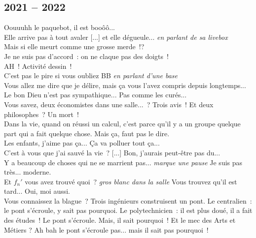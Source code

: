 \documentclass[french, a4paper, openany]{book}
\begin{document}
	\subsection*{2021 -- 2022}

	\noindent \og Oouuuhh le paquebot, il est booôô... \fg \\
	\og Elle arrive pas à tout avaler [...] et elle dégueule... \fg \emph{en parlant de sa livebox} \\
	\og Mais si elle meurt comme une grosse merde~!? \fg \\
	\og Je ne suis pas d'accord~: on ne claque pas des doigts~! \fg \\
	\og AH~! Activité dessin~! \fg \\
	\og C'est pas le pire si vous oubliez BB \fg \emph{en parlant d'une base} \\
	\og Vous allez me dire que je délire, mais ça vous l'avez compris depuis longtemps... \fg \\
	\og Le bon Dieu n'est pas sympathique... Pas comme les curés... \fg \\
	\og Vous savez, deux économistes dans une salle...~? Trois avis~! Et deux philosophes~? Un mort~! \fg \\
	\og Dans la vie, quand on réussi un calcul, c'est parce qu'il y a un groupe quelque part qui a fait quelque chose. Mais ça, faut pas le dire. \fg \\
	\og Les enfants, j'aime pas ça... Ça va polluer tout ça... \fg \\
	\og C'est à vous que j'ai sauvé la vie~? [...] Bon, j'aurais peut-être pas du... \fg \\
	\og Y a beaucoup de choses qui ne se marrient pas... \emph{marque une pause} Je suis pas très... moderne. \fg \\
	\og Et $f_n'$ vous avez trouvé quoi~? \emph{gros blanc dans la salle} Vous trouvez qu'il est tard... Oui, moi aussi. \fg \\
	\og Vous connaissez la blague~? Trois ingénieurs construisent un pont. Le centralien~: le pont s'écroule, y sait pas pourquoi. Le polytechnicien~: il est plus doué, il a fait des études~! Le pont s'écroule. Mais, il sait pourquoi~! Et le mec des Arts et Métiers ? Ah bah le pont s'écroule pas... mais il sait pas pourquoi~! \fg \\
	
	
\end{document}
